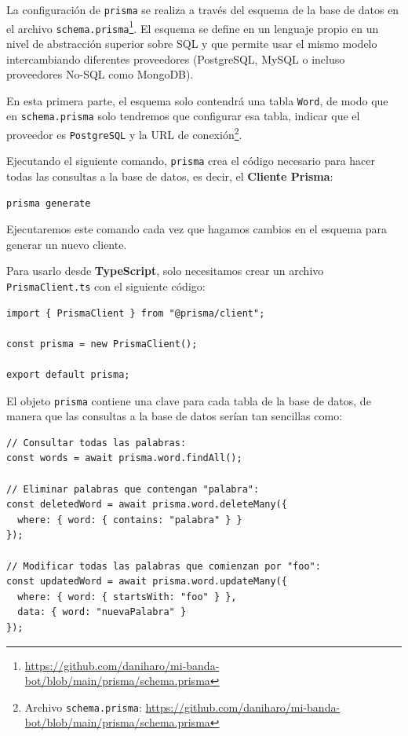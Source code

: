 La configuración de \texttt{prisma} se realiza a través del esquema de la base de datos en el archivo \texttt{schema.prisma}\footnote{\url{https://github.com/daniharo/mi-banda-bot/blob/main/prisma/schema.prisma}}. El esquema se define en un lenguaje propio en un nivel de abstracción superior sobre SQL y que permite usar el mismo modelo intercambiando diferentes proveedores (PostgreSQL, MySQL o incluso proveedores No-SQL como MongoDB).

En esta primera parte, el esquema solo contendrá una tabla \texttt{Word}, de modo que en \texttt{schema.prisma} solo tendremos que configurar esa tabla, indicar que el proveedor es \texttt{PostgreSQL} y la URL de conexión\footnote{Archivo \texttt{schema.prisma}: \url{https://github.com/daniharo/mi-banda-bot/blob/main/prisma/schema.prisma}}.

Ejecutando el siguiente comando, \texttt{prisma} crea el código necesario para hacer todas las consultas a la base de datos, es decir, el \textbf{Cliente Prisma}:

\begin{verbatim}
prisma generate
\end{verbatim}

Ejecutaremos este comando cada vez que hagamos cambios en el esquema para generar un nuevo cliente.

Para usarlo desde \textbf{TypeScript}, solo necesitamos crear un archivo \\ \texttt{PrismaClient.ts} con el siguiente código:

\begin{verbatim}
import { PrismaClient } from "@prisma/client";

const prisma = new PrismaClient();

export default prisma;
\end{verbatim}

El objeto \texttt{prisma} contiene una clave para cada tabla de la base de datos, de manera que las consultas a la base de datos serían tan sencillas como:

\begin{verbatim}
// Consultar todas las palabras:
const words = await prisma.word.findAll();

// Eliminar palabras que contengan "palabra":
const deletedWord = await prisma.word.deleteMany({
  where: { word: { contains: "palabra" } }
});

// Modificar todas las palabras que comienzan por "foo":
const updatedWord = await prisma.word.updateMany({
  where: { word: { startsWith: "foo" } },
  data: { word: "nuevaPalabra" }
});
\end{verbatim}

